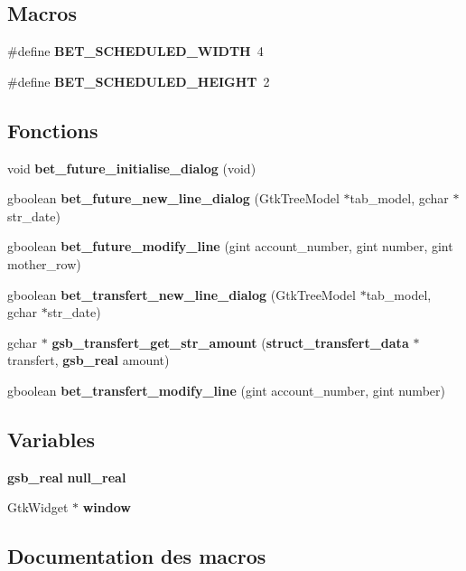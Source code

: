 \subsection*{Macros}
\begin{DoxyCompactItemize}
\item 
\#define {\bf BET\_\-SCHEDULED\_\-WIDTH}~4
\item 
\#define {\bf BET\_\-SCHEDULED\_\-HEIGHT}~2
\end{DoxyCompactItemize}
\subsection*{Fonctions}
\begin{DoxyCompactItemize}
\item 
void {\bf bet\_\-future\_\-initialise\_\-dialog} (void)
\item 
gboolean {\bf bet\_\-future\_\-new\_\-line\_\-dialog} (GtkTreeModel $\ast$tab\_\-model, gchar $\ast$str\_\-date)
\item 
gboolean {\bf bet\_\-future\_\-modify\_\-line} (gint account\_\-number, gint number, gint mother\_\-row)
\item 
gboolean {\bf bet\_\-transfert\_\-new\_\-line\_\-dialog} (GtkTreeModel $\ast$tab\_\-model, gchar $\ast$str\_\-date)
\item 
gchar $\ast$ {\bf gsb\_\-transfert\_\-get\_\-str\_\-amount} ({\bf struct\_\-transfert\_\-data} $\ast$transfert, {\bf gsb\_\-real} amount)
\item 
gboolean {\bf bet\_\-transfert\_\-modify\_\-line} (gint account\_\-number, gint number)
\end{DoxyCompactItemize}
\subsection*{Variables}
\begin{DoxyCompactItemize}
\item 
{\bf gsb\_\-real} {\bf null\_\-real}
\item 
GtkWidget $\ast$ {\bf window}
\end{DoxyCompactItemize}


\subsection{Documentation des macros}
